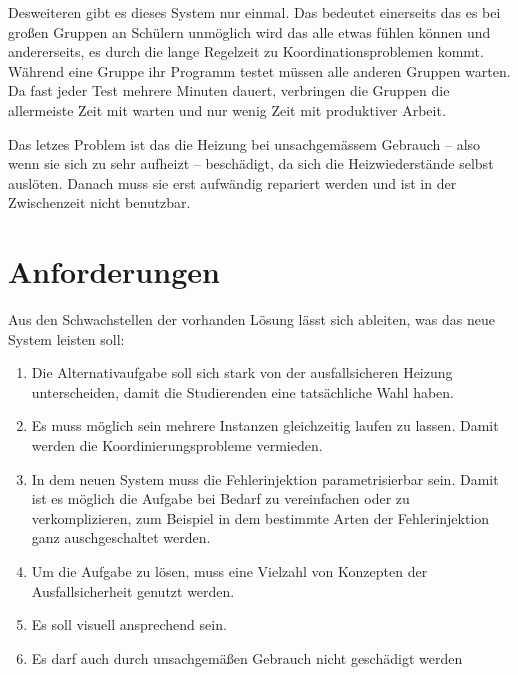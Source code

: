 Desweiteren gibt es dieses System nur einmal. Das bedeutet einerseits das es bei gro{\ss}en Gruppen an Sch{\"{u}}lern unm{\"{o}}glich wird das alle etwas
f{\"{u}}hlen k{\"{o}}nnen und andererseits, es durch die lange Regelzeit zu Koordinationsproblemen kommt. W{\"{a}}hrend eine Gruppe ihr Programm testet m{\"{u}}ssen
alle anderen Gruppen warten. Da fast jeder Test mehrere Minuten dauert, verbringen die Gruppen die allermeiste Zeit mit warten und nur wenig Zeit mit produktiver
Arbeit.

Das letzes Problem ist das die Heizung bei unsachgem{\"{a}}ssem Gebrauch -- also wenn sie sich zu sehr aufheizt --
besch{\"{a}}digt, da sich die Heizwiederst{\"{a}}nde selbst ausl{\"{o}}ten. Danach muss sie erst aufw{\"{a}}ndig
repariert werden und ist in der Zwischenzeit nicht benutzbar.

\clearpage
\section{Anforderungen}\label{anforderung}
Aus den Schwachstellen der vorhanden L{\"{o}}sung l{\"{a}}sst sich ableiten, was das neue System leisten soll:
\begin{enumerate}
	\item Die Alternativaufgabe soll sich stark von der ausfallsicheren Heizung unterscheiden, damit die Studierenden eine tats{\"{a}}chliche Wahl haben.
	\item Es muss m{\"{o}}glich sein mehrere Instanzen gleichzeitig laufen zu lassen. Damit werden die Koordinierungsprobleme vermieden.
	\item In dem neuen System muss die Fehlerinjektion parametrisierbar sein. Damit ist es m{\"{o}}glich
		die Aufgabe bei Bedarf zu vereinfachen oder zu verkomplizieren, zum Beispiel in dem bestimmte
		Arten der Fehlerinjektion ganz auschgeschaltet werden.
	\item Um die Aufgabe zu l{\"{o}}sen, muss eine Vielzahl von Konzepten der Ausfallsicherheit genutzt werden.
	\item Es soll visuell ansprechend sein.
	\item Es darf auch durch unsachgem{\"{a}}{\ss}en Gebrauch nicht gesch{\"{a}}digt werden
\end{enumerate}

\clearpage
